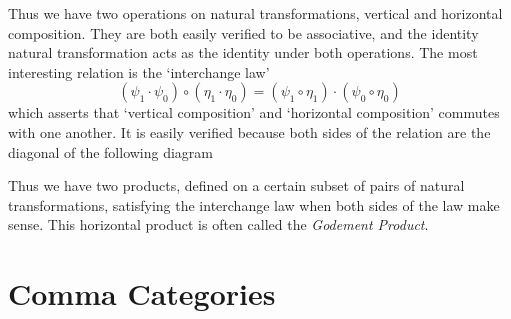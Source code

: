 Thus we have two operations on natural transformations, vertical and horizontal composition. They are both easily verified to be associative, and the identity natural transformation acts as the identity under both operations. The most interesting relation is the `interchange law'
%
\[ (\psi_1 \cdot \psi_0) \circ (\eta_1 \cdot \eta_0) = (\psi_1 \circ \eta_1) \cdot (\psi_0 \circ \eta_0) \]
%
which asserts that `vertical composition' and `horizontal composition' commutes with one another. It is easily verified because both sides of the relation are the diagonal of the following diagram
%
\begin{center}
\end{center}
%
Thus we have two products, defined on a certain subset of pairs of natural transformations, satisfying the interchange law when both sides of the law make sense. This horizontal product is often called the \emph{Godement Product}.

\section{Comma Categories}

